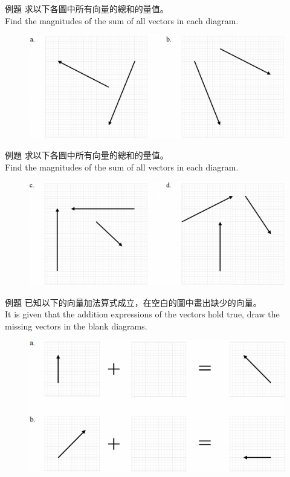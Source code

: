 \documentclass[beamer=true]{standalone}
\begin{document}
\begin{frame}{例題}
    求以下各圖中所有向量的總和的量值。\\Find the magnitudes of the sum of all vectors in each diagram.
    \begin{figure}[h!]
        \centering
        \includegraphics[width=\textwidth]{../../assets/b3abd67b.png}
    \end{figure}
\end{frame}
\begin{frame}{例題}
    求以下各圖中所有向量的總和的量值。\\Find the magnitudes of the sum of all vectors in each diagram.
    \begin{figure}[h!]
        \centering
        \includegraphics[width=\textwidth]{../../assets/2d454bed.png}
    \end{figure}
\end{frame}
\begin{frame}{例題}
    已知以下的向量加法算式成立，在空白的圖中畫出缺少的向量。 \\It is given that the addition expressions of the vectors hold true, draw the missing vectors in the blank diagrams.
    \begin{figure}[h!]
        \centering
        \includegraphics[width=\textwidth]{../../assets/02f3ce52.png}
    \end{figure}
\end{frame}
\end{document}

